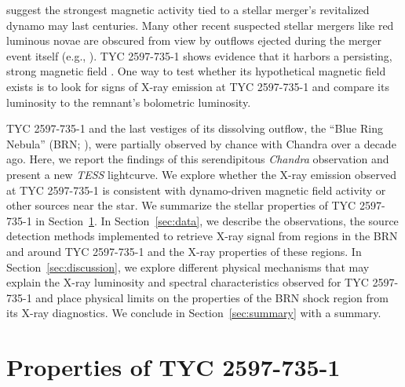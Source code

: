 \documentclass[linenumbers]{aastex631}
\begin{document}
\citet{Soker&Tylenda2007} suggest the strongest magnetic activity tied to a stellar merger's revitalized dynamo may last centuries. Many other recent suspected stellar mergers like red luminous novae are obscured from view by outflows ejected during the merger event itself (e.g., \citealt{Bond+2003, Tylenda+2016}). TYC 2597-735-1 shows evidence that it harbors a persisting, strong magnetic field \citep[e.g., H$\alpha$ emission and variability, radial velocity shifts strongly correlated with the Ca II IRT stellar atmospheric features,][]{2020Natur.587..387H}. One way to test whether its hypothetical magnetic field exists is to look for signs of X-ray emission at TYC 2597-735-1 and compare its luminosity to the remnant's bolometric luminosity.

TYC 2597-735-1 and the last vestiges of its dissolving outflow, the ``Blue Ring Nebula'' (BRN; \citealt{2020Natur.587..387H}), were partially observed by chance with Chandra over a decade ago. Here, we report the findings of this serendipitous \emph{Chandra} observation and present a new \emph{TESS} lightcurve. We explore whether the X-ray emission observed at TYC 2597-735-1 is consistent with dynamo-driven magnetic field activity or other sources near the star. We summarize the stellar properties of TYC 2597-735-1 in Section~\ref{sec:properties}. In Section~\ref{sec:data}, we describe the observations, the source detection methods implemented to retrieve X-ray signal from regions in the BRN and around TYC 2597-735-1 and the X-ray properties of these regions. In Section~\ref{sec:discussion}, we explore different physical mechanisms that may explain the X-ray luminosity and spectral characteristics observed for TYC 2597-735-1 and place physical limits on the properties of the BRN shock region from its X-ray diagnostics. We conclude in Section~\ref{sec:summary} with a summary.

\section{Properties of TYC 2597-735-1}
\label{sec:properties}
\end{document}
